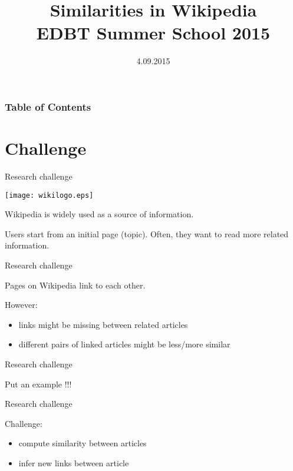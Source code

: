 \documentclass[xcolor=dvipsnames]{beamer}
\begin{document}
\begin{frame}
\title[Challenge 4]{Similarities in Wikipedia \\ EDBT Summer School 2015}
\author[]{}
\date{4.09.2015}
\maketitle
\end{frame}


\begin{frame}
\frametitle{Table of Contents}
\tableofcontents
\end{frame}


\section{Challenge}

\begin{frame}{Research challenge}
 
\begin{center}
\texttt{[image: wikilogo.eps]}
\end{center}

Wikipedia is widely used as a source of information. 

Users start from an initial page (topic). Often, they want to read more related information.

\end{frame}

\begin{frame}{Research challenge}

Pages on Wikipedia link to each other.


However:

\begin{itemize}
\item links might be missing between related articles
\item different pairs of linked articles might be less/more similar
\end{itemize}

\end{frame}


\begin{frame}{Research challenge}

Put an example !!!

\end{frame}

\begin{frame}{Research challenge}


Challenge:

\begin{itemize}
\item compute similarity between articles
\item infer new links between article
\end{itemize}

\end{frame}
\end{document}
